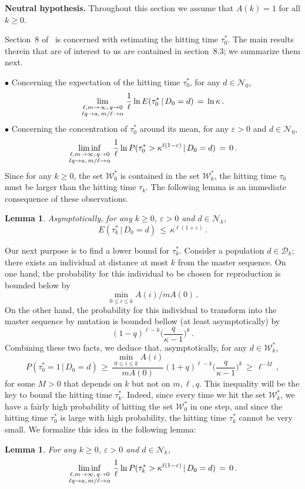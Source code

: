 \documentclass[a4paper,12pt]{article}
\newtheorem{lemma}[theorem]{Lemma}
\theoremstyle{definition}
\theoremstyle{remark}
\def \cD {\mathcal{D}}
\def \cN {\mathcal{N}}
\def \cW {\mathcal{W}}
\def \a {\alpha}
\def \e {\varepsilon}
\def \k {\kappa}
\def \cW {{\mathcal W}^*}
\def\lmq {{\genfrac{}{}{0pt}{1}{\ell,m\to\infty,\,q\to0}{\ell q\to a,\,m/\ell\to\a}}}
\begin{document}
\textbf{Neutral hypothesis.} Throughout this section
we assume that $A(k)=1$ for all $k\geq0$.

Section~8 of~\cite{CerfWF} is concerned with estimating the hitting time $\tau^*_0$.
The main results therein that are of interest to us are contained in section~8.3;
we summarize them next.

$\bullet$ Concerning the expectation of the hitting time $\tau^*_0$,
for any $d\in\cN_0$,
$$\lim_\lmq \frac{1}{\ell}\ln E(\tau^*_0\,|\,D_0=d)\,=\,\ln\k\,.$$
$\bullet$ Concerning the concentration of $\tau^*_0$ around its mean,
for any $\e>0$ and $d\in\cN_0$,
$$\liminf_\lmq\frac{1}{\ell}\ln P(\tau^*_0>\k^{\ell(1-\e)}\,|\,D_0=d)\,=\,0\,.$$
Since for any $k\geq0$, the set $\cW_0$ is contained in the set $\cW_k$,
the hitting time $\tau_0$ must be larger than the hitting time $\tau_k$.
The following lemma is an immediate consequence of these observations.
\begin{lemma}\label{discup}
Asymptotically, for any $k\geq0$, $\e>0$ and $d\in\cN_k$,
$$E(\tau_k^*\,|\,D_0=d)\,\leq\,\k^{\ell(1+\e)}\,.$$
\end{lemma}
Our next purpose is to find a lower bound for $\tau_k^*$.
Consider a population $d\in\cD_k$;
there exists an individual at distance at most $k$ from the master sequence.
On one hand, the probability for this individual to be chosen for reproduction is bounded below by
$$\min_{0\leq i\leq k} A(i)/m A(0)\,.$$
On the other hand, the probability for this individual to transform into the master sequence by mutation
is bounded bellow (at least asymptotically) by
$$(1-q)^{\ell-k}\Big(
\frac{q}{\k-1}
\big)^k\,.$$
Combining these two facts, we deduce that, asymptotically, for any $d\in\cW_k$,
$$P(\tau^*_0=1\,|\,D_0=d)\,\geq\,\frac{\displaystyle \min_{0\leq i\leq k}A(i)}{mA(0)}
(1+q)^{\ell-k}\Big(
\frac{q}{\k-1}
\Big)^{k}\,\geq\,\ell^{-M}\,,$$
for some $M>0$ that depends on $k$ but not on $m,\ell,q$.
This inequality will be the key to bound the hitting time $\tau_k^*$.
Indeed, since every time we hit the set $\cW_k$, 
we have a fairly high probability of hitting the set $\cW_0$ in one step,
and since the hitting time $\tau_0^*$ is large with high probability,
the hitting time $\tau_k^*$ cannot be very small.
We formalize this idea in the following lemma:
\begin{lemma}\label{discdown}
For any $k\geq0$, $\e>0$ and $d\in\cN_k$,
$$\liminf_\lmq \frac{1}{\ell} \ln P(\tau_k^*>\k^{\ell(1-\e)}\,|\,D_0=d)\,=\,0\,.$$
\end{lemma}
\end{document}
